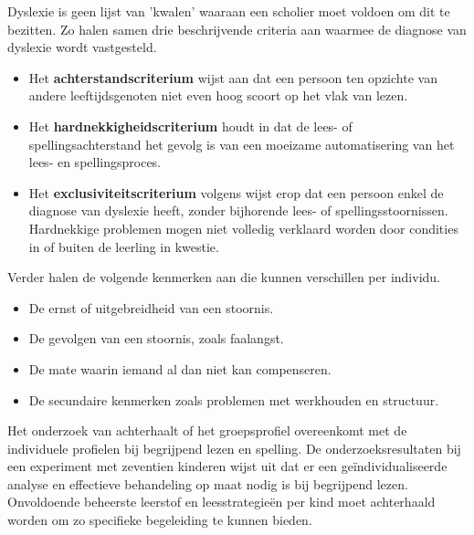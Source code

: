 Dyslexie is geen lijst van 'kwalen' waaraan een scholier moet voldoen om dit te bezitten. Zo halen \textcite{Kleijnen2008, Ghesquiere2018} samen drie beschrijvende criteria aan waarmee de diagnose van dyslexie wordt vastgesteld.

\begin{itemize}
	\item Het \textbf{achterstandscriterium} wijst aan dat een persoon ten opzichte van andere leeftijdsgenoten niet even hoog scoort op het vlak van lezen.
	\item Het \textbf{hardnekkigheidscriterium} houdt in dat de lees- of spellingsachterstand het gevolg is van een moeizame automatisering van het lees- en spellingsproces. %
	\item Het \textbf{exclusiviteitscriterium} volgens \textcite{Ghesquiere2018} wijst erop dat een persoon enkel de diagnose van dyslexie heeft, zonder bijhorende lees- of spellingsstoornissen. Hardnekkige problemen mogen niet volledig verklaard worden door condities in of buiten de leerling in kwestie.  %
\end{itemize}


Verder halen \textcite{VanVreckem2015, Ghesquiere2018} de volgende kenmerken aan die kunnen verschillen per individu.


\begin{itemize}
	\item De ernst of uitgebreidheid van een stoornis.
	\item De gevolgen van een stoornis, zoals faalangst.
	\item De mate waarin iemand al dan niet kan compenseren.
	\item De secundaire kenmerken zoals problemen met werkhouden en structuur.
\end{itemize}

Het onderzoek van \textcite{VanVreckem2015} achterhaalt of het groepsprofiel overeenkomt met de individuele profielen bij begrijpend lezen en spelling. De onderzoeksresultaten bij een experiment met zeventien kinderen wijst uit dat er een geïndividualiseerde analyse en effectieve behandeling op maat nodig is bij begrijpend lezen. Onvoldoende beheerste leerstof en leesstrategieën per kind moet achterhaald worden om zo specifieke begeleiding te kunnen bieden.

